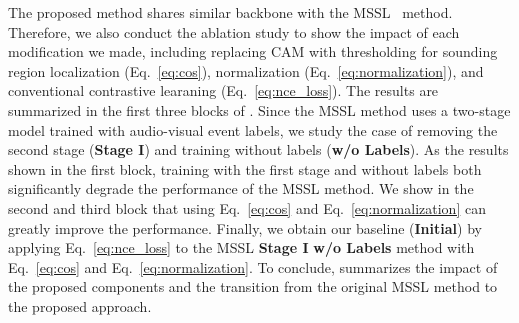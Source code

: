 The proposed method shares similar backbone with the MSSL~\cite{av_eccv20_mms_loc} method.
%
%
Therefore, we also conduct the ablation study to show the impact of each modification we made, including replacing CAM with thresholding for sounding region  localization (Eq.~\eqref{eq:cos}), normalization (Eq.~\eqref{eq:normalization}), and conventional contrastive learaning (Eq.~\eqref{eq:nce_loss}).
%
The results are summarized in the first three blocks of .
%
Since the MSSL method uses a two-stage model trained with audio-visual event labels, we study the case of removing the second stage (\textbf{Stage I}) and training without labels (\textbf{w/o Labels}).
%
As the results shown in the first block, training with the first stage and without labels both significantly degrade the performance of the MSSL method.
%
We show in the second and third block that using Eq.~\eqref{eq:cos} and Eq.~\eqref{eq:normalization} can greatly improve the performance.
%
Finally, we obtain our baseline (\textbf{Initial}) by applying Eq.~\eqref{eq:nce_loss} to the MSSL \textbf{Stage I} \textbf{w/o Labels} method with Eq.~\eqref{eq:cos} and Eq.~\eqref{eq:normalization}.
%
To conclude,  summarizes the impact of the proposed components and the transition from the original MSSL method to the proposed approach.
%
